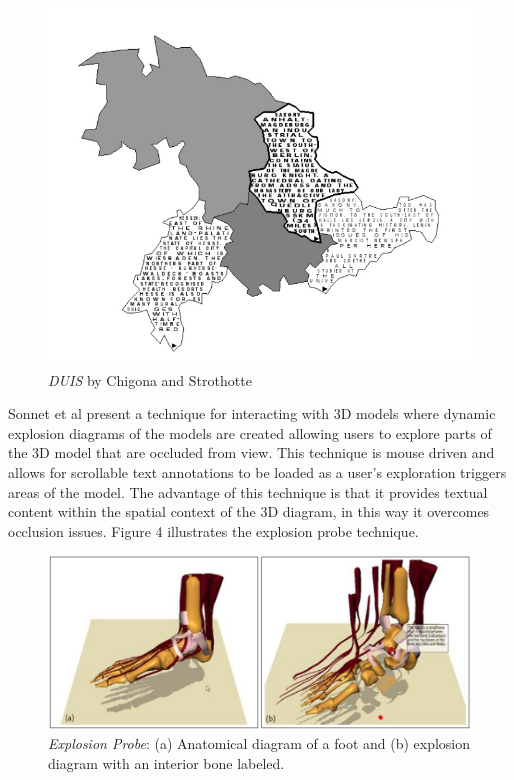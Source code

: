 \documentclass{article}
\begin{document}
	\begin{figure}[htbp]
		\hspace*{2cm}
        \includegraphics[scale=0.35]{Images/duis.jpg}
    	\caption{\textit{DUIS} by Chigona and Strothotte \cite{Chigona:2002:CTE:569005.569010}}
    \end{figure}

Sonnet et al \cite{Sonnet:2004:IEA:989863.989871} present a technique for interacting with 3D models where dynamic explosion diagrams of the models are created allowing users to explore parts of the 3D model that are occluded from view. This technique is mouse driven and allows for scrollable text annotations to be loaded as a user's exploration triggers areas of the model. The advantage of this technique is that it provides textual content within the spatial context of the 3D diagram, in this way it overcomes occlusion issues. Figure 4 illustrates the explosion probe technique.

\begin{figure}[htbp]
		\includegraphics[width=\textwidth]{Images/explosion.jpg}
    	\caption{\textit{Explosion Probe}: (a) Anatomical diagram of a foot and (b) explosion diagram with an interior bone labeled.\cite{Sonnet:2004:IEA:989863.989871}}
    \end{figure}
\end{document}
